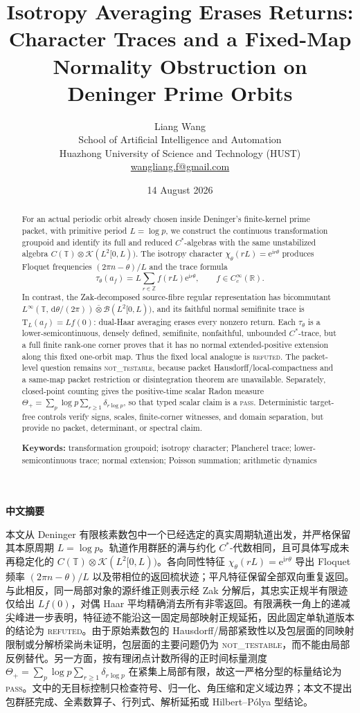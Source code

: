 \documentclass[11pt]{article}
\title{\textbf{Isotropy Averaging Erases Returns: Character Traces and a Fixed-Map Normality Obstruction on Deninger Prime Orbits}}
\author{Liang Wang\\
\small School of Artificial Intelligence and Automation\\
\small Huazhong University of Science and Technology (HUST)\\
\small \href{mailto:wangliang.f@gmail.com}{wangliang.f@gmail.com}}
\date{14 August 2026}
\theoremstyle{definition}
\newcommand{\R}{\mathbb{R}}
\newcommand{\Z}{\mathbb{Z}}
\newcommand{\T}{\mathbb{T}}
\newcommand{\K}{\mathcal{K}}
\newcommand{\B}{\mathcal{B}}
\newcommand{\dd}{\,\mathrm{d}}
\newcommand{\e}{\mathrm{e}}
\newcommand{\ii}{\mathrm{i}}
\newcommand{\Tau}{\mathrm{T}}
\newcommand{\NOTTESTABLE}{\textsc{not\_testable}}
\newcommand{\REFUTED}{\textsc{refuted}}
\newcommand{\PASS}{\textsc{pass}}
\begin{document}
\maketitle

\begin{abstract}
For an actual periodic orbit already chosen inside Deninger's finite-kernel prime packet, with primitive period \(L=\log p\), we construct the continuous transformation groupoid and identify its full and reduced \(C^*\)-algebras with the same unstabilized algebra \(C(\T)\otimes\K(L^2[0,L))\).  The isotropy character \(\chi_\theta(rL)=\e^{\ii r\theta}\) produces Floquet frequencies \((2\pi n-\theta)/L\) and the trace formula
\[
 \tau_\theta(a_f)=L\sum_{r\in\Z}f(rL)\e^{\ii r\theta},
 \qquad f\in C_c^\infty(\R).
\]
In contrast, the Zak-decomposed source-fibre regular representation has bicommutant \(L^\infty(\T,\dd\theta/(2\pi))\bar\otimes\B(L^2[0,L))\), and its faithful normal semifinite trace is \(\Tau_L(a_f)=Lf(0)\): dual-Haar averaging erases every nonzero return.  Each \(\tau_\theta\) is a lower-semicontinuous, densely defined, semifinite, nonfaithful, unbounded \(C^*\)-trace, but a full finite rank-one corner proves that it has no normal extended-positive extension along this fixed one-orbit map.  Thus the fixed local analogue is \REFUTED.  The packet-level question remains \NOTTESTABLE, because packet Hausdorff/local-compactness and a same-map packet restriction or disintegration theorem are unavailable.  Separately, closed-point counting gives the positive-time scalar Radon measure \(\Theta_+=\sum_p\log p\sum_{r\geq1}\delta_{r\log p}\), so that typed scalar claim is a \PASS.  Deterministic target-free controls verify signs, scales, finite-corner witnesses, and domain separation, but provide no packet, determinant, or spectral claim.

\medskip
\noindent\textbf{Keywords:} transformation groupoid; isotropy character; Plancherel trace; lower-semicontinuous trace; normal extension; Poisson summation; arithmetic dynamics
\end{abstract}

\begin{center}
\textbf{中文摘要}
\end{center}
本文从 Deninger 有限核素数包中一个已经选定的真实周期轨道出发，并严格保留其本原周期 \(L=\log p\)。轨道作用群胚的满与约化 \(C^*\)-代数相同，且可具体写成未再稳定化的 \(C(\T)\otimes\K(L^2[0,L))\)。各向同性特征 \(\chi_\theta(rL)=\e^{\ii r\theta}\) 导出 Floquet 频率 \((2\pi n-\theta)/L\) 以及带相位的返回梳状迹；平凡特征保留全部双向重复返回。与此相反，同一局部对象的源纤维正则表示经 Zak 分解后，其忠实正规半有限迹仅给出 \(Lf(0)\)，对偶 Haar 平均精确消去所有非零返回。有限满秩一角上的递减尖峰进一步表明，特征迹不能沿这一固定局部映射正规延拓，因此固定单轨道版本的结论为 \REFUTED。由于原始素数包的 Hausdorff/局部紧致性以及包层面的同映射限制或分解桥梁尚未证明，包层面的主要问题仍为 \NOTTESTABLE，而不能由局部反例替代。另一方面，按有理闭点计数所得的正时间标量测度 \(\Theta_+=\sum_p\log p\sum_{r\geq1}\delta_{r\log p}\) 在紧集上局部有限，故这一严格分型的标量结论为 \PASS。文中的无目标控制只检查符号、归一化、角压缩和定义域边界；本文不提出包群胚完成、全素数算子、行列式、解析延拓或 Hilbert--Pólya 型结论。
\end{document}
